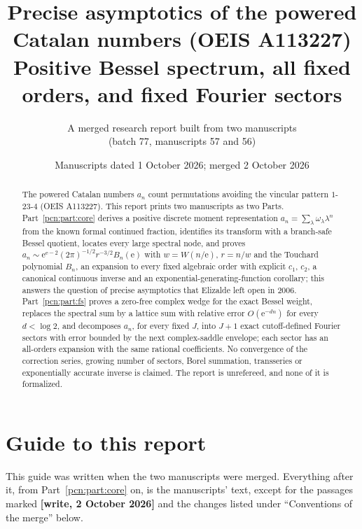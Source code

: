 \documentclass[11pt,letterpaper]{article}
\title{Precise asymptotics of the powered Catalan numbers (OEIS A113227)\\[4pt]
\large Positive Bessel spectrum, all fixed orders, and fixed Fourier sectors}
\author{A merged research report built from two manuscripts\\
(batch 77, manuscripts 57 and 56)}
\date{Manuscripts dated 1 October 2026; merged 2 October 2026}
\theoremstyle{remark}\newtheorem{remark}[theorem]{Remark}
\newcommand{\ee}{\mathrm e}
\begin{document}
\hypersetup{pageanchor=false}
\maketitle
\begin{abstract}
The powered Catalan numbers $a_n$ count permutations avoiding the vincular pattern $1$-$23$-$4$ (OEIS A113227). This report prints two manuscripts as two Parts. Part~\ref{pcn:part:core} derives a positive discrete moment representation $a_n=\sum_\lambda\omega_\lambda\lambda^n$ from the known formal continued fraction, identifies its transform with a branch-safe Bessel quotient, locates every large spectral node, and proves $a_n\sim\ee^{\ee-2}(2\pi)^{-1/2}r^{-3/2}B_n(\ee)$ with $w=W(n/\ee)$, $r=n/w$ and the Touchard polynomial $B_n$, an expansion to every fixed algebraic order with explicit $c_1$, $c_2$, a canonical continuous inverse and an exponential-generating-function corollary; this answers the question of precise asymptotics that Elizalde left open in 2006. Part~\ref{pcn:part:fs} proves a zero-free complex wedge for the exact Bessel weight, replaces the spectral sum by a lattice sum with relative error $O(\ee^{-dn})$ for every $d<\log2$, and decomposes $a_n$, for every fixed $J$, into $J+1$ exact cutoff-defined Fourier sectors with error bounded by the next complex-saddle envelope; each sector has an all-orders expansion with the same rational coefficients. No convergence of the correction series, growing number of sectors, Borel summation, transseries or exponentially accurate inverse is claimed. The report is unrefereed, and none of it is formalized.
\end{abstract}
\setcounter{tocdepth}{2}
\tableofcontents
\hypersetup{pageanchor=true}

\section*{Guide to this report}
\label{pcn:guide}
This guide was written when the two manuscripts were merged. Everything after it, from Part~\ref{pcn:part:core} on, is the manuscripts' text, except for the passages marked \textbf{[write, 2 October 2026]} and the changes listed under ``Conventions of the merge'' below.
\end{document}
